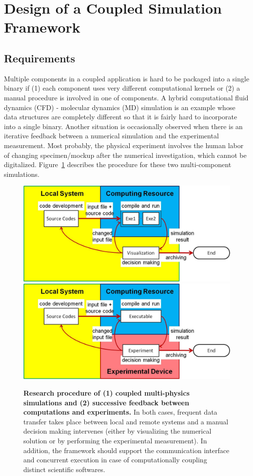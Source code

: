 \documentclass[10pt,conference]{IEEEtran}
\begin{document}
\section{Design of a Coupled Simulation Framework}
\label{sec:design}

\subsection{Requirements}
Multiple components in a coupled application is hard to be packaged 
into a single binary if 
(1) each component uses very different computational kernels 
or 
(2) a manual procedure is involved in one of components.
A hybrid computational fluid dynamics (CFD) - molecular dynamics (MD) 
simulation is an example whose data structures are completely different
so that it is fairly hard to incorporate into a single binary.
Another situation is occasionally observed when there is an iterative
feedback between a numerical simulation and the experimental measurement.
Most probably, the physical experiment involves the human labor
of changing specimen/mockup after the numerical investigation, 
which cannot be digitalized.
Figure~\ref{Fig:Overall_Flow} describes the procedure for 
these two multi-component simulations.


\begin{figure}[ht]
\centering
\includegraphics[width=0.8\linewidth]{Flow_Multiphysics_Simulation.jpg}
\vskip 0.2cm
\includegraphics[width=0.8\linewidth]{Flow_Exp_and_Comp.jpg}
\vskip-0.2cm
\caption{\small {\bf Research procedure of 
(1) coupled multi-physics simulations and 
(2) successive feedback between computations and experiments.} 
In both cases, frequent data transfer takes place between 
local and remote systems and a manual decision making intervenes 
(either by visualizing the numerical solution or 
by performing the experimental measurement). In addition, 
the framework should support the communication interface and 
concurrent execution in case of computationally coupling 
distinct scientific softwares.}
\label{Fig:Overall_Flow}
\end{figure}
\end{document}
